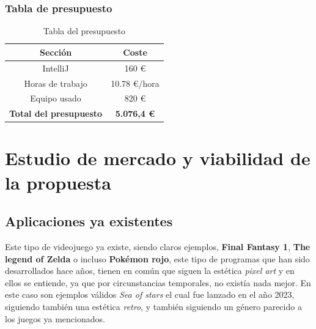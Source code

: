 \documentclass[a4paper]{article}
\begin{document}
\subsubsection{Tabla de presupuesto}
\begin{table}[ht]
    \centering
    \begin{tabular}{|c|c|}
        \hline
        \textbf{Sección}               & \textbf{Coste}      \\
        \hline
        IntelliJ                       & 160 €           \\
        \hline
        Horas de trabajo               & 10.78 €/hora     \\
        \hline
        Equipo usado                   & 820 €           \\
        \hline
        \textbf{Total del presupuesto} & \textbf{5.076,4 €} \\
        \hline
    \end{tabular}
    \caption{Tabla del presupuesto}
    \label{tab:presupuesto-table}
\end{table}


\clearpage
\section{Estudio de mercado y viabilidad de la propuesta}
\subsection{Aplicaciones ya existentes}
Este tipo de videojuego ya existe, siendo claros ejemplos, \textbf{Final Fantasy 1}, \textbf{The legend of Zelda} o incluso \textbf{Pokémon rojo}, este tipo de
programas que han sido desarrollados hace años, tienen en común que siguen la estética \textit{pixel art} y en ellos se entiende, ya que por circunstancias temporales,
no existía nada mejor. En este caso son ejemplos válidos \textit{Sea of stars} el cual fue lanzado en el año 2023, siguiendo también una estética \textit{retro}, y también siguiendo
un género parecido a los juegos ya mencionados.
\end{document}
